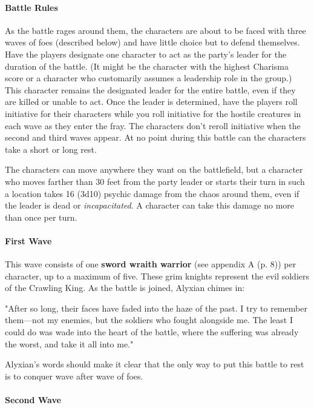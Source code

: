 \documentclass[a4paper, 11pt, bg=full, twocolumn, nooutline]{dndbook}
\begin{document}
\paragraph{Battle Rules}

As the battle rages around them, the characters are about to be faced with three waves of foes (described below) and have little choice but to defend themselves. Have the players designate one character to act as the party's leader for the duration of the battle. (It might be the character with the highest Charisma score or a character who customarily assumes a leadership role in the group.) This character remains the designated leader for the entire battle, even if they are killed or unable to act. Once the leader is determined, have the players roll initiative for their characters while you roll initiative for the hostile creatures in each wave as they enter the fray. The characters don't reroll initiative when the second and third waves appear. At no point during this battle can the characters take a short or long rest.

The characters can move anywhere they want on the battlefield, but a character who moves farther than 30 feet from the party leader or starts their turn in such a location takes 16 (3d10) psychic damage from the chaos around them, even if the leader is dead or \textit{incapacitated}. A character can take this damage no more than once per turn.

\paragraph{First Wave}

This wave consists of one \textbf{sword wraith warrior} (see appendix A (p. 8)) per character, up to a maximum of five. These grim knights represent the evil soldiers of the Crawling King. As the battle is joined, Alyxian chimes in:

\begin{DndReadAloud}
"After so long, their faces have faded into the haze of the past. I try to remember them---not my enemies, but the soldiers who fought alongside me. The least I could do was wade into the heart of the battle, where the suffering was already the worst, and take it all into me."
\end{DndReadAloud}

Alyxian's words should make it clear that the only way to put this battle to rest is to conquer wave after wave of foes.

\paragraph{Second Wave}
\end{document}
